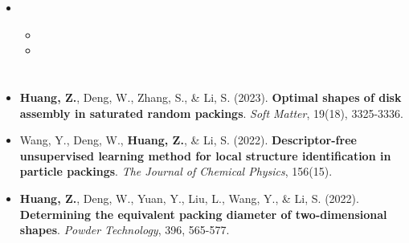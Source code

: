 \documentclass[a4paper]{resume}
\begin{document}
\begin{itemize}
  \item {}\\

  \begin{itemize}[leftmargin=2.0pc]
    \item {}
    \item {}
  \end{itemize}
\end{itemize}



\section{\textbf{}}
\begin{itemize}[parsep=0.2ex]
  \item \textbf{Huang, Z.}, Deng, W., Zhang, S., \& Li, S. (2023). \textbf{Optimal shapes of disk assembly in saturated random packings}. \textit{Soft Matter}, 19(18), 3325-3336.
  \item Wang, Y., Deng, W., \textbf{Huang, Z.}, \& Li, S. (2022). \textbf{Descriptor-free unsupervised learning method for local structure identification in particle packings}. \textit{The Journal of Chemical Physics}, 156(15).
  \item \textbf{Huang, Z.}, Deng, W., Yuan, Y., Liu, L., Wang, Y., \& Li, S. (2022). \textbf{Determining the equivalent packing diameter of two-dimensional shapes}. \textit{Powder Technology}, 396, 565-577.
\end{itemize}
\end{document}
